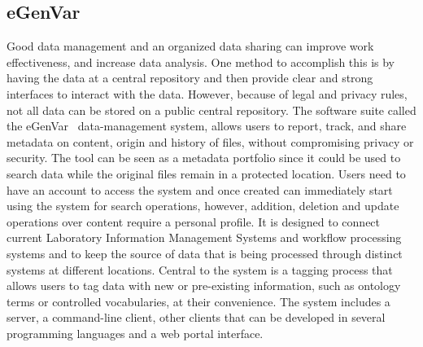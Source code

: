 \subsection*{eGenVar}

Good data management and an organized data sharing can improve work effectiveness, and increase data analysis.
One method to accomplish this is by having the data at a central repository and then provide clear and strong interfaces to interact with the data.
However, because of legal and privacy rules, not all data can be stored on a public central repository.
The software suite called the eGenVar~\cite{egenvar} data-management system, allows users to report, track, and share metadata on content, origin and history of files, without compromising privacy or security.
The tool can be seen as a metadata portfolio since it could be used to search data while the original files remain in a protected location.
Users need to have an account to access the system and once created can immediately start using the system for search operations, however, addition, deletion and update operations over content require a personal profile.
It is designed to connect current Laboratory Information Management Systems and workflow processing systems and to keep the source of data that is being processed through distinct systems at different locations.
Central to the system is a tagging process that allows users to tag data with new or pre-existing information, such as ontology terms or controlled vocabularies, at their convenience.
The system includes a server, a command-line client, other clients that can be developed in several programming languages and a web portal interface.

